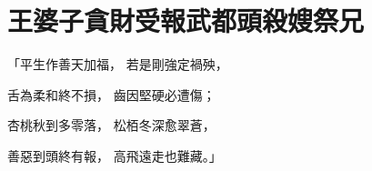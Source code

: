 %

\chapter{王婆子貪財受報\KG 武都頭殺嫂祭兄}


\begin{showcontents}{}



「平生作善天加福，  若是剛強定禍殃，

舌為柔和終不損，  齒因堅硬必遭傷；

杏桃秋到多零落，  松栢冬深愈翠蒼，

善惡到頭終有報，  高飛遠走也難藏。」


\end{showcontents}
